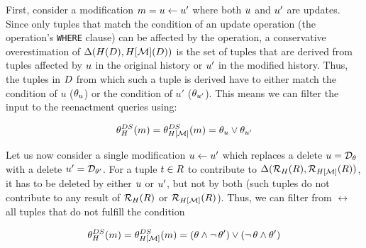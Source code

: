 First, consider a modification $m = u \gets u'$ where both $u$ and $u'$ are updates.
Since only tuples that match the condition of an update operation (the operation's \lstinline!WHERE! clause) can be affected by the operation, a conservative overestimation of $\Delta(H(D),H[\mathcal{M}](D))$ is the set of tuples that are derived from tuples affected by $u$ in the original history or $u'$ in the modified history.
Thus, the tuples in $D$ from which such a tuple is derived have to either match the condition of $u$ ($\theta_{u}$) or the condition of $u'$ ($\theta_{u'}$). This means we can filter the input to the reenactment queries using:

\begin{align}
\theta_{H}^{DS}(m) = \theta_{H[\mathcal{M}]}^{DS}(m) = \theta_{u} \vee \theta_{u'} \label{eq:update-ds-cond}
\end{align}





Let us now consider a single modification $u \gets u'$ which replaces a delete $u = \mathcal{D}_{\theta}$ with a delete $u' = \mathcal{D}_{\theta'}$. For a tuple $t \in R$ to contribute to $\Delta(\mathcal{R}_{H}(R),\mathcal{R}_{H[\mathcal{M}]}(R))$, it has to be deleted by either $u$ or $u'$, but not by both (such tuples do not contribute to any result of $\mathcal{R}_{H}(R)$ or $\mathcal{R}_{H[\mathcal{M}]}(R)$). Thus, we can filter from $\rel$ all tuples that do not fulfill the condition

\begin{align}
\theta_{H}^{DS}(m) = \theta_{H[\mathcal{M}]}^{DS}(m) = (\theta \land \neg\,\theta') \vee (\neg\,\theta \land \theta')\label{eq:ds-del-cond}
\end{align}

